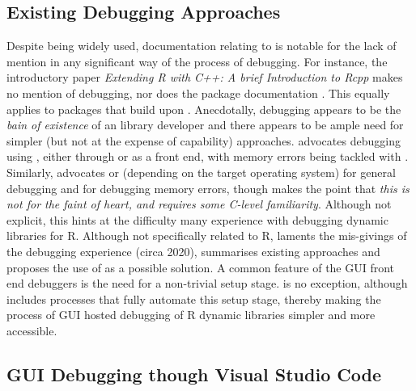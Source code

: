 \hypertarget{exitising-debugging-approaches}{%
\subsection{Existing Debugging Approaches}
\label{exitising-debugging-approaches}}

Despite being widely used, documentation relating to  is notable for the lack of mention in any significant way of the process of debugging. For instance, the 
introductory paper \emph{Extending R with C++: A brief Introduction to Rcpp} \citep{RcppIntro} makes no mention of debugging, nor does the package documentation \citep{Rcpp}. 
This equally applies to packages that build upon . Anecdotally, debugging appears to be the \emph{bain of existence} of an  library developer and 
there appears to be ample need for simpler (but not at the expense of capability) approaches. \citep{DebuggingRandCcodeinR} advocates debugging using 
\citep{GDB}, either through  or \citep{DDD} as a  front end, with memory errors being tackled with \citep{valgrind}. Similarly, 
\citep{DebuggingC_Cpp} advocates  or  \citep{LLDB} (depending on the target operating system) for general debugging and  for debugging memory 
errors, though makes the point that \emph{this is not for the faint of heart, and requires some C-level familiarity}. Although not explicit, this hints at the difficulty
many experience with debugging dynamic libraries for R. Although not specifically related to R, \citep{ImprovingCppDebug} laments the mis-givings of the debugging experience 
(circa 2020), summarises existing approaches and proposes the use of \citep{VSCodeDownload} as a possible solution. A common feature of the 
GUI front end debuggers is the need for a non-trivial setup stage.  is no exception, although  includes processes that fully automate
this setup stage, thereby making the process of GUI hosted debugging of R dynamic libraries simpler and more accessible.

\hypertarget{visual-studio-code-extensions}{%
\subsection{GUI Debugging though Visual Studio Code}
\label{visual-studio-code-extensions}}

